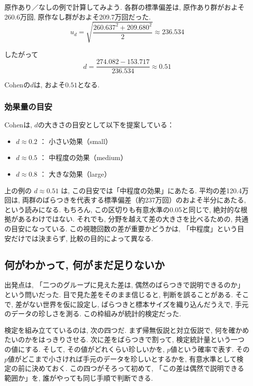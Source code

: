     原作あり／なしの例で計算してみよう.
    各群の標準偏差は, 原作あり群がおよそ260.6万回, 原作なし群がおよそ209.7万回だった.
    \[
      u_d = \sqrt{\frac{260.637^2 + 209.680^2}{2}} \approx 236.534
    \]

    したがって
    \[
      d = \frac{274.082 - 153.717}{236.534} \approx 0.51
    \]

    Cohenの$d$は, およそ$0.51$となる.

    \subsubsection*{効果量の目安}

    Cohenは, $d$の大きさの目安として以下を提案している：

    \begin{itemize}
      \item $d \approx 0.2$ ： 小さい効果（small）
      \item $d \approx 0.5$ ： 中程度の効果（medium）
      \item $d \approx 0.8$ ： 大きな効果（large）
    \end{itemize}

    上の例の $d \approx 0.51$ は, この目安では「中程度の効果」にあたる.
    平均の差120.4万回は, 両群のばらつきを代表する標準偏差（約237万回）のおよそ半分にあたる, という読みになる.
    もちろん, この区切りも有意水準の0.05と同じで, 絶対的な根拠があるわけではない.
    それでも, 分野を越えて差の大きさを比べるための, 共通の目安になっている.
    この視聴回数の差が重要かどうかは, 「中程度」という目安だけでは決まらず, 比較の目的によって異なる.



  \subsection{何がわかって, 何がまだ足りないか}

    出発点は, 「二つのグループに見えた差は, 偶然のばらつきで説明できるのか」という問いだった.
    目で見た差をそのまま信じると, 判断を誤ることがある.
    そこで, 差がない世界を仮に設定し, ばらつきと標本サイズを織り込んだうえで, 手元のデータの珍しさを測る.
    この枠組みが統計的検定だった.

    検定を組み立てているのは, 次の四つだ.
    まず帰無仮説と対立仮説で, 何を確かめたいのかをはっきりさせる.
    次に差をばらつきで割って, 検定統計量という一つの値にする.
    そして, その値がどれくらい珍しいかを, $p$値という確率で表す.
    その$p$値がどこまで小さければ手元のデータを珍しいとするかを, 有意水準として検定の前に決めておく.
    この四つがそろって初めて, 「この差は偶然で説明できる範囲か」を, 誰がやっても同じ手順で判断できる.

